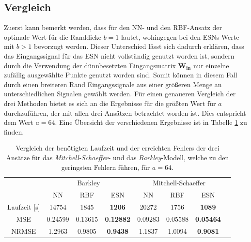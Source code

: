 \subsection{Vergleich}
Zuerst kann bemerkt werden, dass für den \textsc{NN}- und den \textsc{RBF}-Ansatz der optimale Wert für die Randdicke $b=1$ lautet, wohingegen bei den \textsc{ESN}s Werte mit $b > 1$ bevorzugt werden. Dieser Unterschied lässt sich dadurch erklären, dass das Eingangssignal für das \textsc{ESN} nicht vollständig genutzt worden ist, sondern durch die Verwendung der dünnbesetzten Eingangsmatrix $\mathbf{W_{in}}$ nur einzelne zufällig ausgewählte Punkte genutzt worden sind. Somit können in diesem Fall durch einen breiteren Rand Eingangssignale aus einer größeren Menge an unterschiedlichen Signalen gewählt werden.
Für einen genaueren Vergleich der drei Methoden bietet es sich an die Ergebnisse für die größten Wert für $a$ durchzuführen, der mit allen drei Ansätzen betrachtet worden ist. Dies entspricht dem Wert $a=64$. Eine Übersicht der verschiedenen Ergebnisse ist in Tabelle \ref{tab:exp_inner_cross_comparison_results} zu finden.

\begin{table}[h]
	\centering
	\captionsetup{width=0.9\linewidth}
	\begin{tabular}{cccccccc}
		\hline
		\multicolumn{1}{c}{} & \multicolumn{3}{c}{Barkley} & \multicolumn{3}{c}{Mitchell-Schaeffer}		\\
		\multicolumn{1}{c}{} & NN & RBF & ESN & NN & RBF & ESN \\
		
		\hline
		
		Laufzeit [s] 	& 14754		&  	1845	& \textbf{1206}		&	20272 	& 1756		& \textbf{1089}		 \\
		MSE 			& 0.24599	& 0.13615 	& \textbf{0.12882}	&	0.09283	& 0.05588	& 	\textbf{0.05464}  \\
		NRMSE 			& 1.2963	& 0.9805 	& \textbf{0.9438}	&	1.1837	& 1.0094	& \textbf{0.9081} 	 \\
		\hline 
	\end{tabular} 
	\caption{Vergleich der benötigten Laufzeit und der erreichten Fehlers der drei Ansätze für das \textit{Mitchell-Schaeffer}- und das \textit{Barkley}-Modell, welche zu den geringsten Fehlern führen, für $a=64$.}
	\label{tab:exp_inner_cross_comparison_results}
\end{table}

